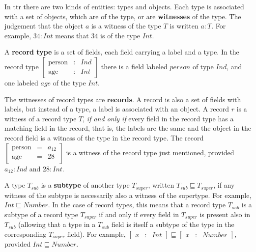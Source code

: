 In \gls{ttr} there are two kinds of entities: types and objects.
Each type is associated with a set of objects, which are of the type, or are \textbf{witnesses} of the type.
The judgement that the object $a$ is a witness of the type $T$ is written $a : T$.
For example, $34 : Int$ means that $34$ is of the type $Int$.

A \textbf{record type} is a set of fields, each field carrying a label and a type.
In the record type $\left[ \begin{array}{rcl} \text{person} &:& Ind \\ \text{age} &:& Int \end{array} \right]$ there is a field labeled $person$ of type $Ind$, and one labeled $age$ of the type $Int$.

The witnesses of record types are \textbf{records}.
A record is also a set of fields with labels, but instead of a type, a label is associated with an object.
A record $r$ is a witness of a record type $T$, \textit{if and only if} every field in the record type has a matching field in the record, that is, the labels are the same and the object in the record field is a witness of the type in the record type.
The record $\left[ \begin{array}{rcl} \text{person} &=& a_{12} \\ \text{age} &=& 28 \end{array} \right]$ is a witness of the record type just mentioned, provided $a_{12} : Ind$ and $28 : Int$.


A type $T_{sub}$ is a \textbf{subtype} of another type $T_{super}$, written $T_{sub} \sqsubseteq T_{super}$, if any witness of the subtype is necessarily also a witness of the supertype.
For example, $Int \sqsubseteq Number$.
In the case of record types, this means that a record type $T_{sub}$ is a subtype of a record type $T_{super}$ if and only if every field in $T_{super}$ is present also in $T_{sub}$ (allowing that a type in a $T_{sub}$ field is itself a subtype of the type in the corresponding $T_{super}$ field).
For example, $\left[ \begin{array}{rcl} x &:& Int \end{array} \right] \sqsubseteq \left[ \begin{array}{rcl} x &:& Number \end{array} \right]$, provided $Int \sqsubseteq Number$.

